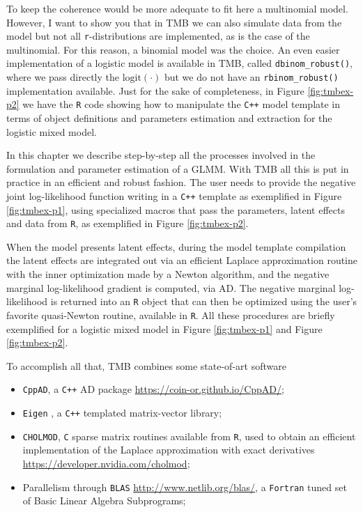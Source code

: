 To keep the coherence would be more adequate to fit here a multinomial
model. However, I want to show you that in TMB we can also simulate data
from the model but not all \texttt{r}-distributions are implemented, as
is the case of the multinomial. For this reason, a binomial model was
the choice. An even easier implementation of a logistic model is
available in TMB, called \texttt{dbinom\_robust()}, where we pass
directly the \(\text{logit}(\cdot)\) but we do not have an
\texttt{rbinom\_robust()} implementation available. Just for the sake of
completeness, in Figure \autoref{fig:tmbex-p2} we have the \texttt{R}
code showing how to manipulate the \texttt{C++} model template in terms
of object definitions and parameters estimation and extraction for the
logistic mixed model.

In this chapter we describe step-by-step all the processes involved in
the formulation and parameter estimation of a GLMM. With TMB all this is
put in practice in an efficient and robust fashion. The user needs to
provide the negative joint log-likelihood function writing in a
\texttt{C++} template as exemplified in Figure \autoref{fig:tmbex-p1},
using specialized macros that pass the parameters, latent effects and
data from \texttt{R}, as exemplified in Figure \autoref{fig:tmbex-p2}.

When the model presents latent effects, during the model template
compilation the latent effects are integrated out via an efficient
Laplace approximation routine with the inner optimization made by a
Newton algorithm, and the negative marginal log-likelihood gradient is
computed, via AD. The negative marginal log-likelihood is returned into
an \texttt{R} object that can then be optimized using the user's
favorite quasi-Newton routine, available in \texttt{R}. All these
procedures are briefly exemplified for a logistic mixed model in Figure
\autoref{fig:tmbex-p1} and Figure \autoref{fig:tmbex-p2}.

To accomplish all that, TMB combines some state-of-art software
\begin{itemize}
 \item \texttt{CppAD}, a \texttt{C++} AD
       package \url{https://coin-or.github.io/CppAD/};

 \item \texttt{Eigen} \cite{eigen}, a \texttt{C++} templated
       matrix-vector library;

 \item \texttt{CHOLMOD}, \texttt{C} sparse matrix routines available
       from \texttt{R}, used to obtain an efficient implementation of
       the Laplace approximation with exact
       derivatives \url{https://developer.nvidia.com/cholmod};

 \item Parallelism
       through \texttt{BLAS} \url{http://www.netlib.org/blas/},
       a \texttt{Fortran} tuned set of Basic Linear Algebra Subprograms;
\end{itemize}

